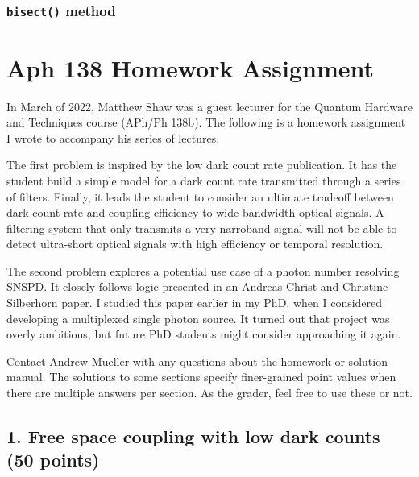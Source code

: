 \documentclass[12pt]{caltech_thesis}
\begin{document}
\hypertarget{bisect-method}{%
\subsubsection{\texorpdfstring{\texttt{bisect()}
method}{bisect() method}}\label{bisect-method}}

\hypertarget{aph-138-homework-assignment}{%
\section{Aph 138 Homework
Assignment}\label{aph-138-homework-assignment}}

In March of 2022, Matthew Shaw was a guest lecturer for the Quantum
Hardware and Techniques course (APh/Ph 138b). The following is a
homework assignment I wrote to accompany his series of lectures.

The first problem is inspired by the low dark count rate
publication\autocite{Mueller:21}. It has the student build a simple
model for a dark count rate transmitted through a series of filters.
Finally, it leads the student to consider an ultimate tradeoff between
dark count rate and coupling efficiency to wide bandwidth optical
signals. A filtering system that only transmits a very narroband signal
will not be able to detect ultra-short optical signals with high
efficiency or temporal resolution.

The second problem explores a potential use case of a photon number
resolving SNSPD. It closely follows logic presented in an Andreas Christ
and Christine Silberhorn paper\autocite{Andreas:12}. I studied this
paper earlier in my PhD, when I considered developing a multiplexed
single photon source. It turned out that project was overly ambitious,
but future PhD students might consider approaching it again.

{\color{midnightblue} Contact
\href{mailto:andrewstermueller@gmail.com}{Andrew Mueller} with any
questions about the homework or solution manual. The solutions to some
sections specify finer-grained point values when there are multiple
answers per section. As the grader, feel free to use these or not. }

\hypertarget{free-space-coupling-with-low-dark-counts-50-points}{%
\subsection{1. Free space coupling with low dark counts (50
points)}\label{free-space-coupling-with-low-dark-counts-50-points}}
\end{document}
